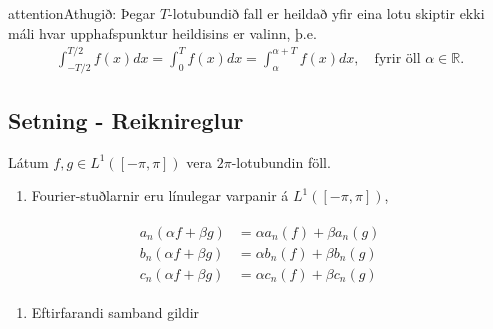 \documentclass[a4paper,10pt,icelandic]{sphinxmanual}
\begin{document}
\begin{sphinxadmonition}{attention}{Athugið:}
Þegar \(T\)-lotubundið fall er heildað yfir eina lotu skiptir ekki máli hvar upphafspunktur heildisins er valinn, þ.e.
\begin{equation*}
\begin{split}\int_{-T/2}^{T/2} f(x) dx = \int_0^T f(x) dx = \int_\alpha^{\alpha + T}f(x)dx, \quad \text{fyrir öll $\alpha\in\mathbb{R}$.}\end{split}
\end{equation*}\end{sphinxadmonition}


\subsection{Setning - Reiknireglur}
\label{\detokenize{Kafli02:setning-reiknireglur}}
Látum \(f,g\in L^1([-\pi,\pi])\) vera \(2\pi\)-lotubundin föll.
\begin{enumerate}
\def\theenumi{\arabic{enumi}}
\def\labelenumi{\theenumi .}
\makeatletter\def\p@enumii{\p@enumi \theenumi .}\makeatother
\item {} 
Fourier-stuðlarnir eru línulegar varpanir á \(L^1([-\pi,\pi])\),

\end{enumerate}
\begin{equation*}
\begin{split}\begin {align*}
    a_n(\alpha f+\beta g) &= \alpha a_n(f) + \beta a_n(g) \\
    b_n(\alpha f+\beta g) &= \alpha b_n(f) + \beta b_n(g) \\
    c_n(\alpha f+\beta g) &= \alpha c_n(f) + \beta c_n(g)
\end{align*}\end{split}
\end{equation*}\begin{enumerate}
\def\theenumi{\arabic{enumi}}
\def\labelenumi{\theenumi .}
\makeatletter\def\p@enumii{\p@enumi \theenumi .}\makeatother
\setcounter{enumi}{1}
\item {} 
Eftirfarandi samband gildir

\end{enumerate}
\end{document}
